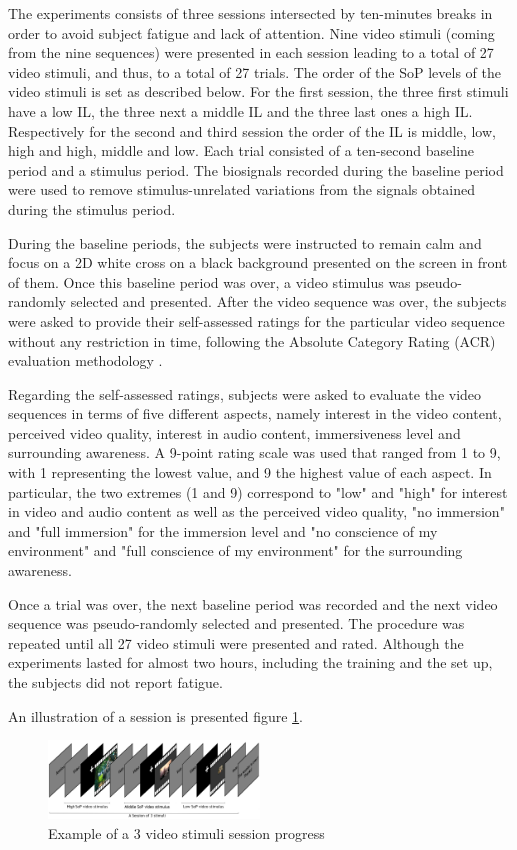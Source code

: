 The experiments consists of three sessions intersected by ten-minutes breaks in order to avoid subject fatigue and lack of attention. Nine video stimuli (coming from the nine sequences) were presented in each session leading to a total of 27 video stimuli, and thus, to a total of 27 trials. 
The order of the \ac{SoP} levels of the video stimuli is set as described below. For the first session, the three first stimuli have a low \ac{IL}, the three next a middle \ac{IL} and the three last ones a high \ac{IL}. Respectively for the second and third session the order of the \ac{IL} is middle, low, high and high, middle and low.
Each trial consisted of a ten-second baseline period and a stimulus period. The biosignals recorded during the baseline period were used to remove stimulus-unrelated variations from the signals obtained during the stimulus period.


During the baseline periods, the subjects were instructed to remain calm and focus on a 2D white cross on a black background presented on the screen in front of them. Once this baseline period was over, a video stimulus was pseudo-randomly selected and presented.
After the video sequence was over, the subjects were asked to provide their self-assessed ratings for the particular video sequence without any restriction in time, following the Absolute Category Rating (ACR) evaluation methodology \cite{ACRevaluation}.

Regarding the self-assessed ratings, subjects were asked to evaluate the video sequences in terms of five different aspects, namely interest in the video content, perceived video quality, interest in audio content, immersiveness level and surrounding awareness. A 9-point rating scale was used that ranged from 1 to 9, with 1 representing the lowest value, and 9 the highest value of each aspect. In particular, the two extremes (1 and 9) correspond to "low" and "high" for interest in video and audio content as well as the perceived video quality, "no immersion" and "full immersion" for the immersion level and "no conscience of my environment" and "full conscience of my environment" for the surrounding awareness.

Once a trial was over, the next baseline period was recorded and the next video sequence was pseudo-randomly selected and presented. The procedure was repeated until all 27 video stimuli were presented and rated. Although the experiments lasted for almost two hours, including the training and the set up, the subjects did not report fatigue.

An illustration of a session is presented figure \ref{session}.

\begin{figure}[!ht]
    \center
    \includegraphics[width=0.5\textwidth]{./images/ExSession_.png}
    \caption{Example of a 3 video stimuli session progress }
    \label{session}
\end{figure}









